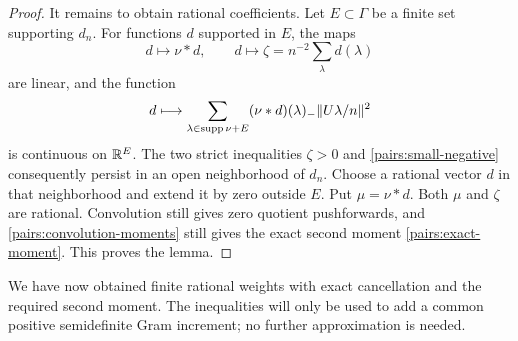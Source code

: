 \begin{proof}
It remains to obtain rational coefficients. Let $E\subset\Gamma$ be
a finite set supporting $d_n$. For functions $d$ supported in $E$, the
maps
\[
 d\longmapsto\nu*d,
 \qquad d\longmapsto\zeta=n^{-2}\sum_\lambda d(\lambda)
\]
are linear, and the function
\[
 d\longmapsto
 \sum_{\lambda\in\operatorname{supp}\nu+E}(\nu*d)(\lambda)_-\|U\lambda/n\|^2
\]
is continuous on $\mathbb R^E$. The two strict inequalities $\zeta>0$ and
\eqref{pairs:small-negative} consequently persist in an open neighborhood
of $d_n$. Choose a rational vector $d$ in that neighborhood and extend it
by zero outside $E$. Put $\mu=\nu*d$. Both $\mu$ and $\zeta$ are rational.
Convolution still gives zero quotient pushforwards, and
\eqref{pairs:convolution-moments} still gives the exact second moment
\eqref{pairs:exact-moment}. This proves the lemma.
\end{proof}

We have now obtained finite rational weights with exact cancellation
and the required second moment. The inequalities will only be used to
add a common positive semidefinite Gram increment; no further
approximation is needed.

